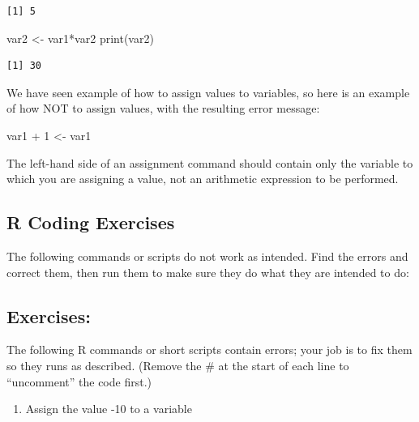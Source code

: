 \documentclass[
  letterpaper,
  DIV=11,
  numbers=noendperiod]{scrreprt}
\newenvironment{Shaded}{\begin{snugshade}}{\end{snugshade}}
\newcommand{\DecValTok}[1]{\textcolor[rgb]{0.68,0.00,0.00}{#1}}
\newcommand{\FunctionTok}[1]{\textcolor[rgb]{0.28,0.35,0.67}{#1}}
\newcommand{\NormalTok}[1]{\textcolor[rgb]{0.00,0.23,0.31}{#1}}
\newcommand{\OtherTok}[1]{\textcolor[rgb]{0.00,0.23,0.31}{#1}}
\newcommand{\SpecialCharTok}[1]{\textcolor[rgb]{0.37,0.37,0.37}{#1}}
\providecommand{\tightlist}{%
  \setlength{\itemsep}{0pt}\setlength{\parskip}{0pt}}\usepackage{longtable,booktabs,array}
\begin{document}
\begin{verbatim}
[1] 5
\end{verbatim}

\begin{Shaded}
\begin{Highlighting}[]
\NormalTok{var2 }\OtherTok{\textless{}{-}}\NormalTok{ var1}\SpecialCharTok{*}\NormalTok{var2}
\FunctionTok{print}\NormalTok{(var2)}
\end{Highlighting}
\end{Shaded}

\begin{verbatim}
[1] 30
\end{verbatim}

We have seen example of how to assign values to variables, so here is an
example of how NOT to assign values, with the resulting error message:

\begin{Shaded}
\begin{Highlighting}[]
\NormalTok{var1 }\SpecialCharTok{+} \DecValTok{1} \OtherTok{\textless{}{-}}\NormalTok{ var1}
\end{Highlighting}
\end{Shaded}

The left-hand side of an assignment command should contain only the
variable to which you are assigning a value, not an arithmetic
expression to be performed.

\hypertarget{r-coding-exercises-1}{%
\subsection{R Coding Exercises}\label{r-coding-exercises-1}}

The following commands or scripts do not work as intended. Find the
errors and correct them, then run them to make sure they do what they
are intended to do:

\hypertarget{exercises}{%
\subsection{Exercises:}\label{exercises}}

The following R commands or short scripts contain errors; your job is to
fix them so they runs as described. (Remove the \# at the start of each
line to ``uncomment'' the code first.)

\begin{enumerate}
\def\labelenumi{\arabic{enumi}.}
\tightlist
\item
  Assign the value -10 to a variable
\end{enumerate}
\end{document}
